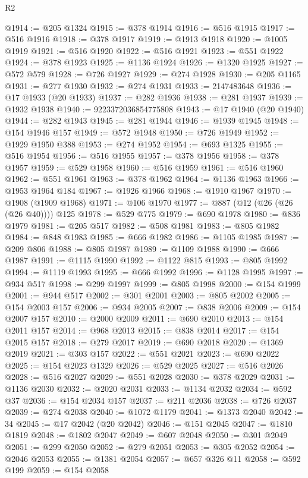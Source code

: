 \begin{lexlean}{R2}
\begin{coremodule}
@1914 := @205 @1324
@1915 := @378 @1914
@1916 := @516 @1915
@1917 := @516 @1916
@1918 := @378 @1917
@1919 := @1913 @1918
@1920 := @1005 @1919
@1921 := @516 @1920
@1922 := @516 @1921
@1923 := @551 @1922
@1924 := @378 @1923
@1925 := @1136 @1924
@1926 := @1320 @1925
@1927 := @572 @579
@1928 := @726 @1927
@1929 := @274 @1928
@1930 := @205 @1165
@1931 := @277 @1930
@1932 := @274 @1931
@1933 := 2147483648
@1936 := @17 @1933 (@20 @1933)
@1937 := @282 @1936
@1938 := @281 @1937
@1939 := @1932 @1938
@1940 := 9223372036854775808
@1943 := @17 @1940 (@20 @1940)
@1944 := @282 @1943
@1945 := @281 @1944
@1946 := @1939 @1945
@1948 := @154 @1946 @157
@1949 := @572 @1948
@1950 := @726 @1949
@1952 := @1929 @1950 @388
@1953 := @274 @1952
@1954 := @693 @1325
@1955 := @516 @1954
@1956 := @516 @1955
@1957 := @378 @1956
@1958 := @378 @1957
@1959 := @529 @1958
@1960 := @516 @1959
@1961 := @516 @1960
@1962 := @551 @1961
@1963 := @378 @1962
@1964 := @1136 @1963
@1966 := @1953 @1964 @184
@1967 := @1926 @1966
@1968 := @1910 @1967
@1970 := @1908 (@1909 @1968)
@1971 := @106 @1970
@1977 := @887 (@12 (@26 (@26 (@26 @40)))) @125
@1978 := @529 @775
@1979 := @690 @1978
@1980 := @836 @1979
@1981 := @205 @517
@1982 := @508 @1981
@1983 := @805 @1982
@1984 := @848 @1983
@1985 := @666 @1982
@1986 := @1105 @1985
@1987 := @209 @806
@1988 := @805 @1987
@1989 := @1109 @1988
@1990 := @666 @1987
@1991 := @1115 @1990
@1992 := @1122 @815
@1993 := @805 @1992
@1994 := @1119 @1993
@1995 := @666 @1992
@1996 := @1128 @1995
@1997 := @934 @517
@1998 := @299 @1997
@1999 := @805 @1998
@2000 := @154 @1999
@2001 := @944 @517
@2002 := @301 @2001
@2003 := @805 @2002
@2005 := @154 @2003 @157
@2006 := @934 @2005
@2007 := @838 @2006
@2009 := @154 @2007 @157
@2010 := @2000 @2009
@2011 := @690 @2010
@2013 := @154 @2011 @157
@2014 := @968 @2013
@2015 := @838 @2014
@2017 := @154 @2015 @157
@2018 := @279 @2017
@2019 := @690 @2018
@2020 := @1369 @2019
@2021 := @303 @157
@2022 := @551 @2021
@2023 := @690 @2022
@2025 := @154 @2023 @1329
@2026 := @529 @2025
@2027 := @516 @2026
@2028 := @516 @2027
@2029 := @551 @2028
@2030 := @378 @2029
@2031 := @1136 @2030
@2032 := @2020 @2031
@2033 := @1134 @2032
@2034 := @592 @37
@2036 := @154 @2034 @157
@2037 := @211 @2036
@2038 := @726 @2037
@2039 := @274 @2038
@2040 := @1072 @1179
@2041 := @1373 @2040
@2042 := 34
@2045 := @17 @2042 (@20 @2042)
@2046 := @151 @2045
@2047 := @1810 @1819
@2048 := @1802 @2047
@2049 := @607 @2048
@2050 := @301 @2049
@2051 := @299 @2050
@2052 := @279 @2051
@2053 := @305 @2052
@2054 := @2046 @2053
@2055 := @1381 @2054
@2057 := @657 @326 @11
@2058 := @592 @199
@2059 := @154 @2058

\end{coremodule}
\end{lexlean}
